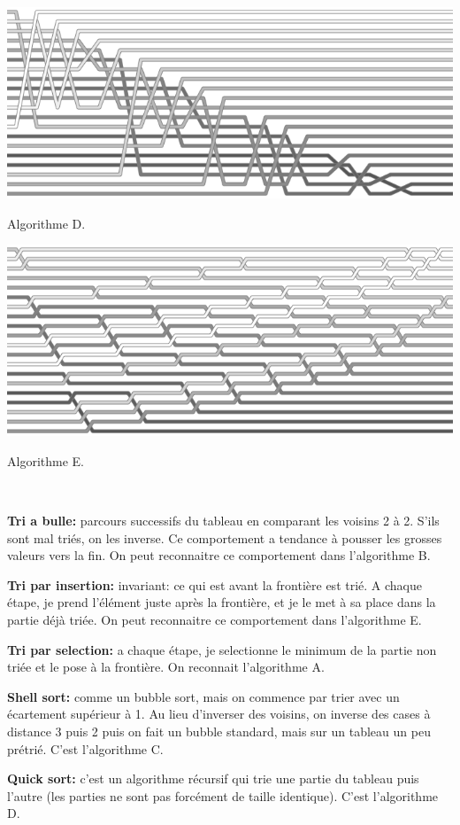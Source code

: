 \documentclass[10pt]{article}\usepackage[nu]{esial}
\begin{document}
\noindent\hfill\begin{minipage}{.35\linewidth}
  \includegraphics[width=\linewidth]{selection.png}

  \centerline{Algorithme D.}
\end{minipage}\hfill\begin{minipage}{.35\linewidth}
  \includegraphics[width=\linewidth]{bubble.png}

  \centerline{Algorithme E.}
\end{minipage}\hfill~

\begin{Reponse}
  \textbf{Tri a bulle:} parcours successifs du tableau en comparant les voisins
  2 à 2. S'ils sont mal triés, on les inverse. Ce comportement a tendance à
  pousser les grosses valeurs vers la fin. On peut reconnaitre ce comportement
  dans l'algorithme B.

  \textbf{Tri par insertion:} invariant: ce qui est avant la frontière est
  trié. A chaque étape, je prend l'élément juste après la frontière, et je le
  met à sa place dans la partie déjà triée. On peut reconnaitre ce comportement
  dans l'algorithme E.

  \textbf{Tri par selection:} a chaque étape, je selectionne le minimum de la
  partie non triée et le pose à la frontière. On reconnait l'algorithme A.

  \textbf{Shell sort:} comme un bubble sort, mais on commence par trier avec un
  écartement supérieur à 1. Au lieu d'inverser des voisins, on inverse des
  cases à distance 3 puis 2 puis on fait un bubble standard, mais sur un
  tableau un peu prétrié. C'est l'algorithme C.

  \textbf{Quick sort:} c'est un algorithme récursif qui trie une partie du
  tableau puis l'autre (les parties ne sont pas forcément de taille
  identique). C'est l'algorithme D.
\end{Reponse}
\end{document}
